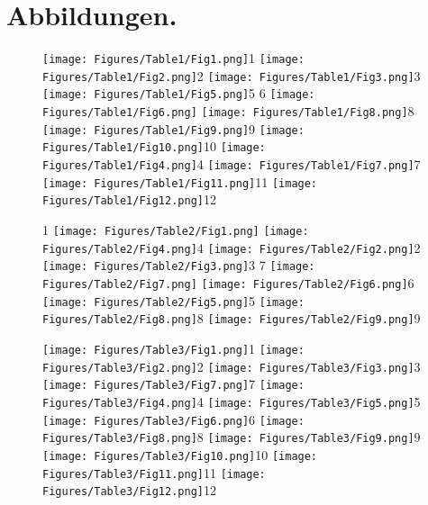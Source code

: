 \documentclass[a4paper, 11pt, oneside, german]{article}
\begin{document}
\section{Abbildungen.}
\clearpage
\setlength\intextsep{0pt}
\pagestyle{fancy}
\fancyhf{}
\cfoot{\thepage}
\begin{figure}[p]
\texttt{[image: Figures/Table1/Fig1.png]}\tiny 1
\texttt{[image: Figures/Table1/Fig2.png]}\tiny 2
\texttt{[image: Figures/Table1/Fig3.png]}\tiny 3
\texttt{[image: Figures/Table1/Fig5.png]}\tiny 5
\tiny   6
\texttt{[image: Figures/Table1/Fig6.png]}
\texttt{[image: Figures/Table1/Fig8.png]}\tiny 8
\texttt{[image: Figures/Table1/Fig9.png]}\tiny 9
\texttt{[image: Figures/Table1/Fig10.png]}\tiny 10
\texttt{[image: Figures/Table1/Fig4.png]}\tiny 4
\texttt{[image: Figures/Table1/Fig7.png]}\tiny 7
\texttt{[image: Figures/Table1/Fig11.png]}\tiny 11
\texttt{[image: Figures/Table1/Fig12.png]}\tiny 12
\end{figure}
\clearpage
{}
\cfoot{\thepage}
\begin{figure}[p]
\tiny 1
\texttt{[image: Figures/Table2/Fig1.png]}
\texttt{[image: Figures/Table2/Fig4.png]}\tiny 4
\texttt{[image: Figures/Table2/Fig2.png]}\tiny 2
\texttt{[image: Figures/Table2/Fig3.png]}\tiny 3
\tiny 7
\texttt{[image: Figures/Table2/Fig7.png]}
\texttt{[image: Figures/Table2/Fig6.png]}\tiny 6
\texttt{[image: Figures/Table2/Fig5.png]}\tiny 5
\texttt{[image: Figures/Table2/Fig8.png]}\tiny 8
\texttt{[image: Figures/Table2/Fig9.png]}\tiny 9
\end{figure}
\clearpage
{}
\cfoot{\thepage}
\begin{figure}[p]
\texttt{[image: Figures/Table3/Fig1.png]}\tiny 1
\texttt{[image: Figures/Table3/Fig2.png]}\tiny 2
\texttt{[image: Figures/Table3/Fig3.png]}\tiny 3
\texttt{[image: Figures/Table3/Fig7.png]}\tiny 7
\texttt{[image: Figures/Table3/Fig4.png]}\tiny 4
\texttt{[image: Figures/Table3/Fig5.png]}\tiny 5
\texttt{[image: Figures/Table3/Fig6.png]}\tiny 6
\texttt{[image: Figures/Table3/Fig8.png]}\tiny 8
\texttt{[image: Figures/Table3/Fig9.png]}\tiny 9
\texttt{[image: Figures/Table3/Fig10.png]}\tiny 10
\texttt{[image: Figures/Table3/Fig11.png]}\tiny 11
\texttt{[image: Figures/Table3/Fig12.png]}\tiny 12
\end{figure}
\end{document}
